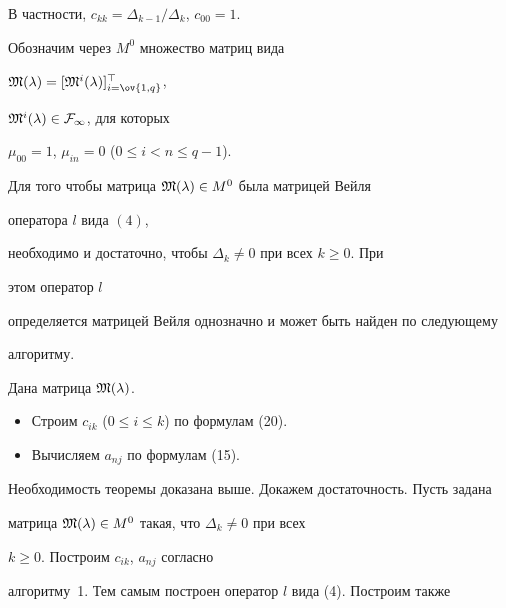 В частности, $c_{kk}=\Delta_{k-1}/\Delta_k$, $c_{00}=1$. 


 


Обозначим через $M^0$ множество матриц вида 


$\frak M(\lambda)=[\frak M^i(\lambda)]^\top_{i=\ov{1,q}}$, 


$\frak M^i(\lambda)\in\cal F_1$, для которых 


$\mu_{00}=1$, $\mu_{in}=0$ ($0\le i<n\le q-1$). 


 


\begin{thm} 


Для того чтобы матрица $\frak M(\lambda)\in M^0$ была матрицей Вейля 


оператора $l$ вида $(4)$, 


необходимо и достаточно, чтобы $\Delta_k\ne 0$ при всех $k\ge 0$. При 


этом оператор $l$ 


определяется матрицей Вейля однозначно и может быть найден по следующему 


алгоритму. 


\end{thm} 


 


\begin{alg} 


Дана матрица $\frak M(\lambda)$. 


\begin{itemize} 


\item[1)] Строим $c_{ik}$ ($0\le i\le k$) по формулам (20). 


\item[2)] Вычисляем $a_{nj}$ по формулам (15). 


\end{itemize} 


\end{alg} 


 


Необходимость теоремы доказана выше. Докажем достаточность. Пусть задана 


матрица $\frak M(\lambda)\in M^0$ такая, что $\Delta_k\ne 0$ при всех 


$k\ge 0$. Построим $c_{ik}$, $a_{nj}$ согласно 


алгоритму~1. Тем самым построен оператор $l$ вида (4). Построим также 


